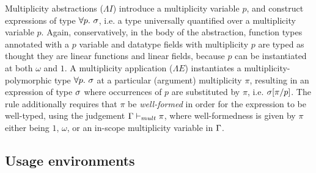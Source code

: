 \documentclass[acmsmall,review,anonymous,screen]{acmart}
\begin{document}
Multiplicity abstractions ($\Lambda I$) introduce a multiplicity variable $p$,
and construct expressions of type $\forall p.~\sigma$, i.e. a type universally
quantified over a multiplicity variable $p$. Again, conservatively, in the body
of the abstraction, function types annotated with a $p$ variable and datatype
fields with multiplicity $p$ are typed as thought they are linear functions and
linear fields, because $p$ can be instantiated at both $\omega$ and $1$.
A multiplicity application ($\Lambda E$) instantiates a multiplicity-polymorphic type
$\forall p.~\sigma$ at a particular (argument) multiplicity $\pi$, resulting in an
expression of type $\sigma$ where occurrences of $p$ are substituted by $\pi$, i.e.
$\sigma[\pi/p]$.
The rule additionally requires that $\pi$ be \emph{well-formed} in order
for the expression to be well-typed, using the judgement $\Gamma \vdash_{mult}
\pi$, where well-formedness is given by $\pi$ either being $1$, $\omega$, or an
in-scope  multiplicity variable in $\Gamma$.



\subsection{Usage environments\label{sec:usage-environments}}
\end{document}
